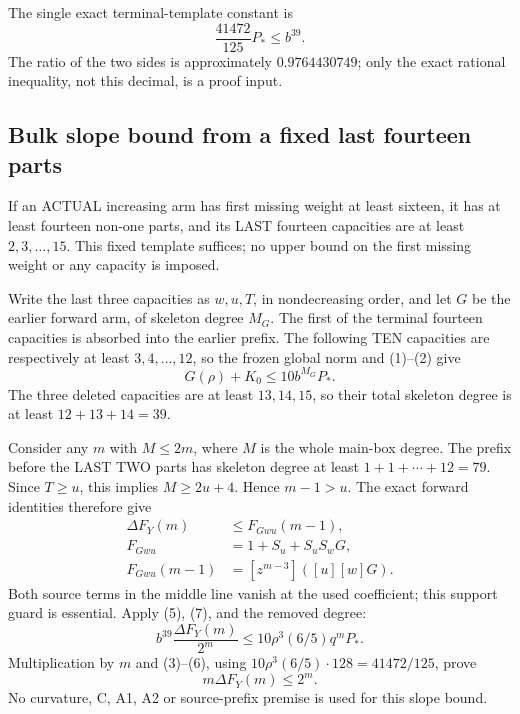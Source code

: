 The single exact terminal-template constant is
\[
                \frac{41472}{125}P_*\le b^{39}.        \tag{6}
\]
The ratio of the two sides is approximately $0.9764430749$;
only the exact rational inequality, not this decimal, is a proof input.

\subsection{Bulk slope bound from a fixed last fourteen parts}
If an ACTUAL increasing arm has first missing weight at least sixteen,
it has at least fourteen non-one parts, and its LAST fourteen capacities
are at least $2,3,\ldots,15$. This fixed template suffices; no upper
bound on the first missing weight or any capacity is imposed.

Write the last three capacities as $w,u,T$, in nondecreasing order,
and let $G$ be the earlier forward arm, of skeleton degree $M_G$.
The first of the terminal fourteen capacities is absorbed into the
earlier prefix. The following TEN capacities are respectively at least
$3,4,\ldots,12$, so the frozen global norm and (1)--(2) give
\[
                       G(\rho)+K_0\le10b^{M_G}P_*.
                                                               \tag{7}
\]
The three deleted capacities are at least $13,14,15$, so their total
skeleton degree is at least $12+13+14=39$.

Consider any $m$ with $M\le2m$, where $M$ is the whole main-box degree.
The prefix before the LAST TWO parts has skeleton degree at least
$1+1+\cdots+12=79$. Since $T\ge u$, this implies $M\ge2u+4$.
Hence $m-1>u$. The exact forward identities therefore give
\[
 \begin{split}
 \Delta F_Y(m)&\le F_{Gwu}(m-1),\\
 F_{Gwu}&=1+S_u+S_uS_wG,\\
 F_{Gwu}(m-1)&=[z^{m-3}]([u][w]G).
 \end{split}                                                    \tag{8}
\]
Both source terms in the middle line vanish at the used coefficient;
this support guard is essential. Apply (5), (7), and the removed degree:
\[
 b^{39}\frac{\Delta F_Y(m)}{2^m}
     \le10\rho^3(6/5)q^m P_*.
\]
Multiplication by $m$ and (3)--(6), using
$10\rho^3(6/5)\cdot128=41472/125$, prove
\[
                          m\Delta F_Y(m)\le2^m.       \tag{9}
\]
No curvature, C, A1, A2 or source-prefix premise is used for this slope bound.

